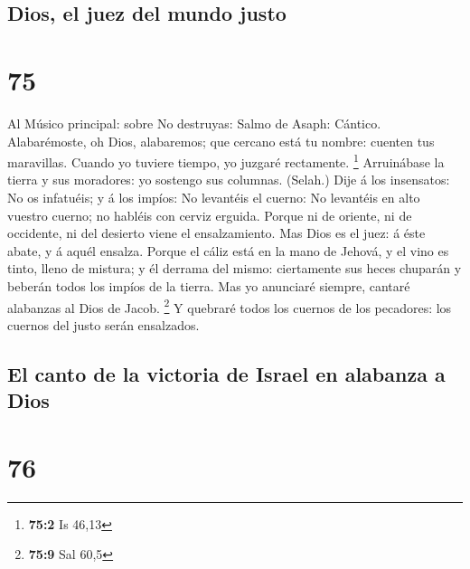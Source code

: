 \hypertarget{dios-el-juez-del-mundo-justo}{%
\subsection{Dios, el juez del mundo
justo}\label{dios-el-juez-del-mundo-justo}}

\hypertarget{section-74}{%
\section{75}\label{section-74}}

 Al Músico principal: sobre No destruyas: Salmo de Asaph:
Cántico. Alabarémoste, oh Dios, alabaremos; que cercano está tu nombre:
cuenten tus maravillas.  Cuando yo tuviere tiempo, yo
juzgaré rectamente. \footnote{\textbf{75:2} Is 46,13} 
Arruinábase la tierra y sus moradores: yo sostengo sus columnas.
(Selah.)  Dije á los insensatos: No os infatuéis; y á los
impíos: No levantéis el cuerno:  No levantéis en alto
vuestro cuerno; no habléis con cerviz erguida.  Porque ni de
oriente, ni de occidente, ni del desierto viene el ensalzamiento.
 Mas Dios es el juez: á éste abate, y á aquél ensalza.
 Porque el cáliz está en la mano de Jehová, y el vino es
tinto, lleno de mistura; y él derrama del mismo: ciertamente sus heces
chuparán y beberán todos los impíos de la tierra.  Mas yo
anunciaré siempre, cantaré alabanzas al Dios de Jacob. \footnote{\textbf{75:9}
  Sal 60,5}  Y quebraré todos los cuernos de los pecadores:
los cuernos del justo serán ensalzados.

\hypertarget{el-canto-de-la-victoria-de-israel-en-alabanza-a-dios}{%
\subsection{El canto de la victoria de Israel en alabanza a
Dios}\label{el-canto-de-la-victoria-de-israel-en-alabanza-a-dios}}

\hypertarget{section-75}{%
\section{76}\label{section-75}}


